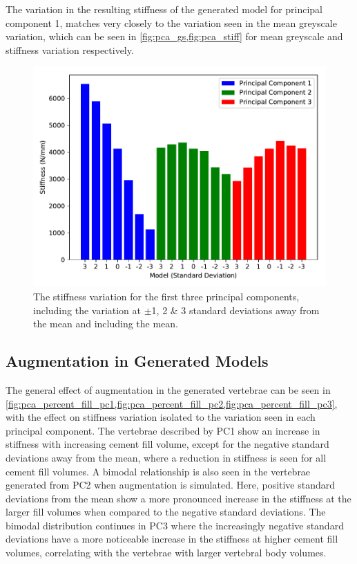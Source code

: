 The variation in the resulting stiffness of the generated model for principal
component 1, matches very closely to the variation seen in the mean greyscale
variation, which can be seen in \cref{fig:pca_gs,fig:pca_stiff} for mean
greyscale and stiffness variation respectively.

\begin{figure}[h]
  \centering
  \includegraphics[width=.9\textwidth]{Chapters/Chapter_PCA_images/pca_stiff.pdf}
  \caption{The stiffness variation for the first three principal components,
	including the variation at $\pm$1, 2 \& 3 standard deviations away from
	the mean and including the mean.}
  \label{fig:pca_stiff}
\end{figure}

\subsection{Augmentation in Generated Models}


The general effect of augmentation in the generated vertebrae can be seen in
\cref{fig:pca_percent_fill_pc1,fig:pca_percent_fill_pc2,fig:pca_percent_fill_pc3},
with the effect on stiffness variation isolated to the variation seen in each
principal component.  The vertebrae described by PC1 show an increase in
stiffness with increasing cement fill volume, except for the negative standard
deviations away from the mean, where a reduction in stiffness is seen for all
cement fill volumes.  A bimodal relationship is also seen in the vertebrae
generated from PC2 when augmentation is simulated.  Here, positive standard
deviations from the mean show a more pronounced increase in the stiffness at
the larger fill volumes when compared to the negative standard deviations.  The
bimodal distribution continues in PC3 where the increasingly negative standard
deviations have a more noticeable increase in the stiffness at higher cement
fill volumes, correlating with the vertebrae with larger vertebral body
volumes.

